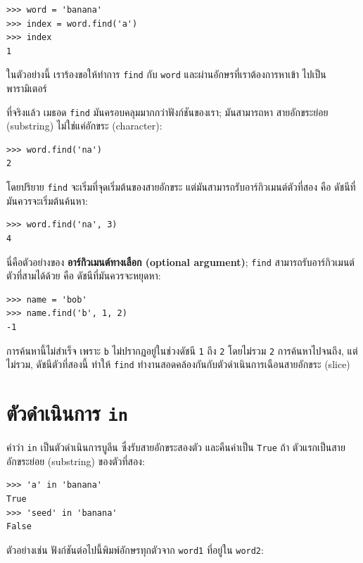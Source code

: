 \begin{verbatim}
>>> word = 'banana'
>>> index = word.find('a')
>>> index
1
\end{verbatim}
%
ในตัวอย่างนี้ เราร้องขอให้ทำการ {\tt find} กับ {\tt word} และผ่านอักษรที่เราต้องการหาเข้า
ไปเป็นพารามิเตอร์

ที่จริงแล้ว เมธอด {\tt find} มันครอบคลุมมากกว่าฟังก์ชันของเรา; มันสามารถหา
สายอักขระย่อย (substring) ไม่ใช่แค่อักขระ (character):

\begin{verbatim}
>>> word.find('na')
2
\end{verbatim}
%
โดยปริยาย {\tt find} จะเริ่มที่จุดเริ่มต้นของสายอักขระ แต่มันสามารถรับอาร์กิวเมนต์ตัวที่สอง
คือ ดัชนีที่มันควรจะเริ่มต้นค้นหา:

\begin{verbatim}
>>> word.find('na', 3)
4
\end{verbatim}
%
นี่คือตัวอย่างของ {\bf อาร์กิวเมนต์ทางเลือก (optional argument)};
{\tt find} สามารถรับอาร์กิวเมนต์ตัวที่สามได้ด้วย คือ ดัชนีที่มันควรจะหยุดหา:

\begin{verbatim}
>>> name = 'bob'
>>> name.find('b', 1, 2)
-1
\end{verbatim}
%
การค้นหานี้ไม่สำเร็จ เพราะ {\tt b} ไม่ปรากฏอยู่ในช่วงดัชนี {\tt 1} ถึง {\tt 2} โดยไม่รวม {\tt 2}
การค้นหาไปจนถึง, แต่ไม่รวม, ดัชนีตัวที่สองนี้ ทำให้ {\tt find} ทำงานสอดคล้องกันกับตัวดำเนินการเฉือนสายอักขระ (slice)




\section{ตัวดำเนินการ {\tt in}}
\label{inboth}

คำว่า {\tt in} เป็นตัวดำเนินการบูลีน ซึ่งรับสายอักขระสองตัว และคืนค่าเป็น {\tt True} ถ้า
ตัวแรกเป็นสายอักขระย่อย (substring) ของตัวที่สอง:

\begin{verbatim}
>>> 'a' in 'banana'
True
>>> 'seed' in 'banana'
False
\end{verbatim}
%
ตัวอย่างเช่น ฟังก์ชันต่อไปนี้พิมพ์อักษรทุกตัวจาก {\tt word1} ที่อยู่ใน {\tt word2}:


